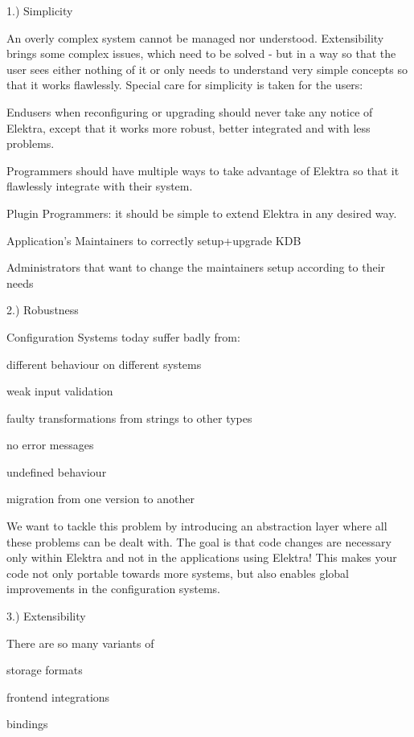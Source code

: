 1.) Simplicity

An overly complex system cannot be managed nor understood. Extensibility brings some complex issues, which need to be solved -\/ but in a way so that the user sees either nothing of it or only needs to understand very simple concepts so that it works flawlessly. Special care for simplicity is taken for the users\+:


\begin{DoxyItemize}
\item Endusers when reconfiguring or upgrading should never take any notice of Elektra, except that it works more robust, better integrated and with less problems.
\item Programmers should have multiple ways to take advantage of Elektra so that it flawlessly integrate with their system.
\item Plugin Programmers\+: it should be simple to extend Elektra in any desired way.
\item Application's Maintainers to correctly setup+upgrade K\+D\+B
\item Administrators that want to change the maintainers setup according to their needs
\end{DoxyItemize}

2.) Robustness

Configuration Systems today suffer badly from\+:


\begin{DoxyItemize}
\item different behaviour on different systems
\item weak input validation
\item faulty transformations from strings to other types
\item no error messages
\item undefined behaviour
\item migration from one version to another
\end{DoxyItemize}

We want to tackle this problem by introducing an abstraction layer where all these problems can be dealt with. The goal is that code changes are necessary only within Elektra and not in the applications using Elektra! This makes your code not only portable towards more systems, but also enables global improvements in the configuration systems.

3.) Extensibility

There are so many variants of


\begin{DoxyItemize}
\item storage formats
\item frontend integrations
\item bindings
\end{DoxyItemize}

